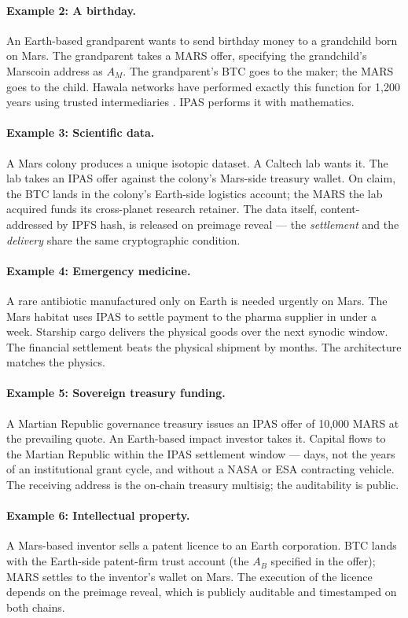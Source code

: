 \documentclass[11pt]{article}
\begin{document}
\paragraph{Example 2: A birthday.}
An Earth-based grandparent wants to send birthday money to a grandchild born on Mars. The grandparent takes a MARS offer, specifying the grandchild's Marscoin address as $A_M$. The grandparent's BTC goes to the maker; the MARS goes to the child. Hawala networks have performed exactly this function for 1{,}200 years using trusted intermediaries \citep{zubrin1995}. IPAS performs it with mathematics.

\paragraph{Example 3: Scientific data.}
A Mars colony produces a unique isotopic dataset. A Caltech lab wants it. The lab takes an IPAS offer against the colony's Mars-side treasury wallet. On claim, the BTC lands in the colony's Earth-side logistics account; the MARS the lab acquired funds its cross-planet research retainer. The data itself, content-addressed by IPFS hash, is released on preimage reveal --- the \emph{settlement} and the \emph{delivery} share the same cryptographic condition.

\paragraph{Example 4: Emergency medicine.}
A rare antibiotic manufactured only on Earth is needed urgently on Mars. The Mars habitat uses IPAS to settle payment to the pharma supplier in under a week. Starship cargo delivers the physical goods over the next synodic window. The financial settlement beats the physical shipment by months. The architecture matches the physics.

\paragraph{Example 5: Sovereign treasury funding.}
A Martian Republic governance treasury issues an IPAS offer of 10{,}000 MARS at the prevailing quote. An Earth-based impact investor takes it. Capital flows to the Martian Republic within the IPAS settlement window --- days, not the years of an institutional grant cycle, and without a NASA or ESA contracting vehicle. The receiving address is the on-chain treasury multisig; the auditability is public.

\paragraph{Example 6: Intellectual property.}
A Mars-based inventor sells a patent licence to an Earth corporation. BTC lands with the Earth-side patent-firm trust account (the $A_B$ specified in the offer); MARS settles to the inventor's wallet on Mars. The execution of the licence depends on the preimage reveal, which is publicly auditable and timestamped on both chains.
\end{document}
